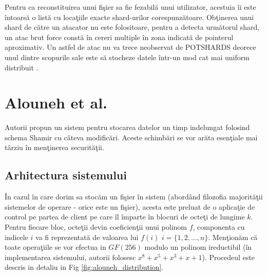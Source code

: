 \documentclass{llncs}
\newcommand{\todo}[1]{{\color{red}{TODO #1}}}
\begin{document}
Pentru ca reconstituirea unui fi\c{s}ier sa fie fezabil\u{a} unui utilizator, acestuia \^{i}i este \^{i}ntoars\u{a} o list\u{a} cu loca\c{t}iile exacte shard-urilor corespunz\u{a}toare.
Ob\c{t}inerea unui shard de c\u{a}tre un atacator nu este folositoare, pentru a detecta urm\u{a}torul shard, un atac brut force const\u{a} \^{i}n cereri multiple \^{i}n zona indicat\u{a} de pointerul aproximativ. Un astfel de atac nu va trece neobservat de POTSHARDS deorece unul dintre scopurile sale este s\u{a} stocheze datele \^{i}ntr-un mod cat mai uniform distribuit \todo{spread}.\cite{SGMV:2009}

\section{Alouneh et al.}
\todo{Alt nume poate?}
\label{sec:desc_alouneh}
Autorii propun un sistem pentru stocarea datelor un timp indelungat folosind schema Shamir cu c\^{a}teva modific\u{a}ri. Aceste schimb\u{a}ri se vor ar\u{a}ta esen\c{t}iale mai t\^{a}rziu \^{i}n men\c{t}inerea securit\u{a}\c{t}ii.

\subsection{Arhitectura sistemului}

\^{I}n cazul \^{i}n care dorim sa stoc\u{a}m un fi\c{s}ier \^{i}n sistem (abord\^{a}nd filozofia majorit\u{a}\c{t}ii sistemelor de operare - orice este un fi\c{s}ier), acesta este preluat de o aplica\c{t}ie de control pe partea de client pe care \^{i}l \^{i}mparte \^{i}n blocuri de octe\c{t}i de lungime $k$. Pentru fiecare bloc, octe\c{t}ii devin coeficien\c{t}ii unui polinom $f$, componenta cu indicele $i$ va fi reprezentat\u{a} de valoarea lui $f(i)$ $i = \{1,2,\dots, n\}$. Men\c{t}ion\u{a}m c\u{a} toate opera\c{t}iile se vor efectua in $GF(256)$ modulo un polinom ireductibil (\^{i}n implementarea sistemului, autorii folosesc $x^8 + x^5 + x^3 + x + 1$). Procedeul este descris in detaliu in Fig \ref{fig:alouneh_distribution}.
\end{document}
